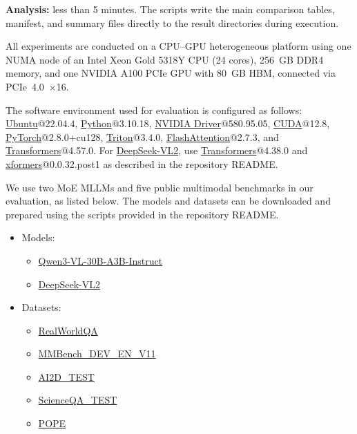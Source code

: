\documentclass[conference]{IEEEtran}
\begin{document}
\noindent\textbf{Analysis:} less than 5 minutes. The scripts write the main
comparison tables, manifest, and summary files directly to the result
directories during execution.

\artin


All experiments are conducted on a CPU--GPU
heterogeneous platform using one NUMA node of an Intel Xeon Gold 5318Y CPU
(24 cores), 256~GB DDR4 memory, and one NVIDIA A100 PCIe GPU with 80~GB HBM,
connected via PCIe~4.0~$\times$16.


The software environment used for evaluation is configured as follows:
\href{https://ubuntu.com/}{Ubuntu}@22.04.4,
\href{https://www.python.org/}{Python}@3.10.18,
\href{https://www.nvidia.com/drivers/}{NVIDIA Driver}@580.95.05,
\href{https://developer.nvidia.com/cuda-toolkit}{CUDA}@12.8,
\href{https://pytorch.org/}{PyTorch}@2.8.0+cu128,
\href{https://github.com/triton-lang/triton}{Triton}@3.4.0,
\href{https://github.com/Dao-AILab/flash-attention}{FlashAttention}@2.7.3,
and \href{https://github.com/huggingface/transformers}{Transformers}@4.57.0.
For \href{https://huggingface.co/deepseek-ai/deepseek-vl2}{DeepSeek-VL2}, use
\href{https://github.com/huggingface/transformers}{Transformers}@4.38.0 and
\href{https://github.com/facebookresearch/xformers}{xformers}@0.0.32.post1 as
described in the repository README.


We use two MoE MLLMs and five public multimodal benchmarks in our evaluation,
as listed below. The models and datasets can be downloaded and prepared using
the scripts provided in the repository README.
\begin{itemize}
\item Models:
  \begin{itemize}
  \item \href{https://huggingface.co/Qwen/Qwen3-VL-30B-A3B-Instruct}{Qwen3-VL-30B-A3B-Instruct}
  \item \href{https://huggingface.co/deepseek-ai/deepseek-vl2}{DeepSeek-VL2}
  \end{itemize}
\item Datasets:
  \begin{itemize}
  \item \href{https://opencompass.openxlab.space/utils/VLMEval/RealWorldQA.tsv}{RealWorldQA}
  \item \href{https://opencompass.openxlab.space/utils/benchmarks/MMBench/MMBench_DEV_EN_V11.tsv}{MMBench\_DEV\_EN\_V11}
  \item \href{https://opencompass.openxlab.space/utils/VLMEval/AI2D_TEST.tsv}{AI2D\_TEST}
  \item \href{https://opencompass.openxlab.space/utils/benchmarks/ScienceQA/ScienceQA_TEST.tsv}{ScienceQA\_TEST}
  \item \href{https://opencompass.openxlab.space/utils/VLMEval/POPE.tsv}{POPE}
  \end{itemize}
\end{itemize}
\end{document}
